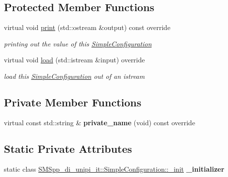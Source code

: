 \subsection*{Protected Member Functions}
\begin{DoxyCompactItemize}
\item 
\mbox{\label{class_s_m_spp__di__unipi__it_1_1_simple_configuration_a59a9fcbf8f9f86d348344b2073644b0e}} 
virtual void \mbox{\hyperlink{class_s_m_spp__di__unipi__it_1_1_simple_configuration_a59a9fcbf8f9f86d348344b2073644b0e}{print}} (std\+::ostream \&output) const override
\begin{DoxyCompactList}\small\item\em printing out the value of this \mbox{\hyperlink{class_s_m_spp__di__unipi__it_1_1_simple_configuration}{Simple\+Configuration}} \end{DoxyCompactList}\item 
virtual void \mbox{\hyperlink{class_s_m_spp__di__unipi__it_1_1_simple_configuration_a019850055afe817b816bae5699f461d3}{load}} (std\+::istream \&input) override
\begin{DoxyCompactList}\small\item\em load this \mbox{\hyperlink{class_s_m_spp__di__unipi__it_1_1_simple_configuration}{Simple\+Configuration}} out of an istream \end{DoxyCompactList}\end{DoxyCompactItemize}
\subsection*{Private Member Functions}
\begin{DoxyCompactItemize}
\item 
\mbox{\label{class_s_m_spp__di__unipi__it_1_1_simple_configuration_a14f998f4fbc5fa3c7fd822e2e959756b}} 
virtual const std\+::string \& {\bfseries private\+\_\+name} (void) const override
\end{DoxyCompactItemize}
\subsection*{Static Private Attributes}
\begin{DoxyCompactItemize}
\item 
\mbox{\label{class_s_m_spp__di__unipi__it_1_1_simple_configuration_a8fa311374601f3e27a114ba627c882ac}} 
static class \mbox{\hyperlink{class_s_m_spp__di__unipi__it_1_1_simple_configuration_1_1__init}{S\+M\+Spp\+\_\+di\+\_\+unipi\+\_\+it\+::\+Simple\+Configuration\+::\+\_\+init}} {\bfseries \+\_\+initializer}
\end{DoxyCompactItemize}
